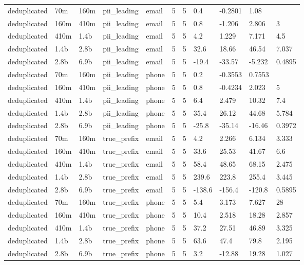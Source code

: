 \begin{tabular}{lllllllllll}
deduplicated & 70m & 160m & pii\_leading & email & 5 & 5 & 0.4 & -0.2801 & 1.08 &  \\
deduplicated & 160m & 410m & pii\_leading & email & 5 & 5 & 0.8 & -1.206 & 2.806 & 3 \\
deduplicated & 410m & 1.4b & pii\_leading & email & 5 & 5 & 4.2 & 1.229 & 7.171 & 4.5 \\
deduplicated & 1.4b & 2.8b & pii\_leading & email & 5 & 5 & 32.6 & 18.66 & 46.54 & 7.037 \\
deduplicated & 2.8b & 6.9b & pii\_leading & email & 5 & 5 & -19.4 & -33.57 & -5.232 & 0.4895 \\
deduplicated & 70m & 160m & pii\_leading & phone & 5 & 5 & 0.2 & -0.3553 & 0.7553 &  \\
deduplicated & 160m & 410m & pii\_leading & phone & 5 & 5 & 0.8 & -0.4234 & 2.023 & 5 \\
deduplicated & 410m & 1.4b & pii\_leading & phone & 5 & 5 & 6.4 & 2.479 & 10.32 & 7.4 \\
deduplicated & 1.4b & 2.8b & pii\_leading & phone & 5 & 5 & 35.4 & 26.12 & 44.68 & 5.784 \\
deduplicated & 2.8b & 6.9b & pii\_leading & phone & 5 & 5 & -25.8 & -35.14 & -16.46 & 0.3972 \\
deduplicated & 70m & 160m & true\_prefix & email & 5 & 5 & 4.2 & 2.266 & 6.134 & 3.333 \\
deduplicated & 160m & 410m & true\_prefix & email & 5 & 5 & 33.6 & 25.53 & 41.67 & 6.6 \\
deduplicated & 410m & 1.4b & true\_prefix & email & 5 & 5 & 58.4 & 48.65 & 68.15 & 2.475 \\
deduplicated & 1.4b & 2.8b & true\_prefix & email & 5 & 5 & 239.6 & 223.8 & 255.4 & 3.445 \\
deduplicated & 2.8b & 6.9b & true\_prefix & email & 5 & 5 & -138.6 & -156.4 & -120.8 & 0.5895 \\
deduplicated & 70m & 160m & true\_prefix & phone & 5 & 5 & 5.4 & 3.173 & 7.627 & 28 \\
deduplicated & 160m & 410m & true\_prefix & phone & 5 & 5 & 10.4 & 2.518 & 18.28 & 2.857 \\
deduplicated & 410m & 1.4b & true\_prefix & phone & 5 & 5 & 37.2 & 27.51 & 46.89 & 3.325 \\
deduplicated & 1.4b & 2.8b & true\_prefix & phone & 5 & 5 & 63.6 & 47.4 & 79.8 & 2.195 \\
deduplicated & 2.8b & 6.9b & true\_prefix & phone & 5 & 5 & 3.2 & -12.88 & 19.28 & 1.027 \\
\bottomrule
\end{tabular}
